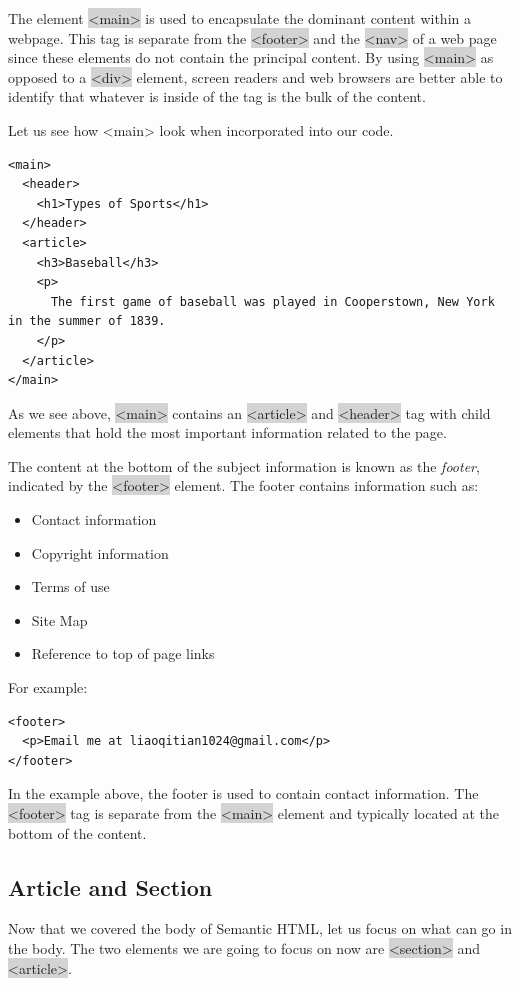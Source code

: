 \documentclass[11pt]{article}
\begin{document}
The element \colorbox{lightgray}{<main>} is used to encapsulate the dominant content within a webpage. This tag is separate from the \colorbox{lightgray}{<footer>} and the \colorbox{lightgray}{<nav>} of a web page since these elements do not contain the principal content. By using \colorbox{lightgray}{<main>} as opposed to a \colorbox{lightgray}{<div>} element, screen readers and web browsers are better able to identify that whatever is inside of the tag is the bulk of the content.

Let us see how <main> look when incorporated into our code. 
\begin{lstlisting}
<main>
  <header>
    <h1>Types of Sports</h1>
  </header>
  <article>
    <h3>Baseball</h3>
    <p>
      The first game of baseball was played in Cooperstown, New York in the summer of 1839.
    </p>
  </article>
</main>
\end{lstlisting}
As we see above, \colorbox{lightgray}{<main>} contains an \colorbox{lightgray}{<article>} and \colorbox{lightgray}{<header>} tag with child elements that hold the most important information related to the page.

The content at the bottom of the subject information is known as the \textit{footer}, indicated by the \colorbox{lightgray}{<footer>} element. The footer contains information such as:
\begin{itemize}[leftmargin = *]
\item Contact information
\item Copyright information
\item Terms of use
\item Site Map
\item Reference to top of page links
\end{itemize}
For example:
\begin{lstlisting}
<footer>
  <p>Email me at liaoqitian1024@gmail.com</p>
</footer>
\end{lstlisting}
In the example above, the footer is used to contain contact information. The \colorbox{lightgray}{<footer>} tag is separate from the \colorbox{lightgray}{<main>} element and typically located at the bottom of the content.

\subsection{Article and Section}
Now that we covered the body of Semantic HTML, let us focus on what can go in the body. The two elements we are going to focus on now are \colorbox{lightgray}{<section>} and \colorbox{lightgray}{<article>}.
\end{document}
